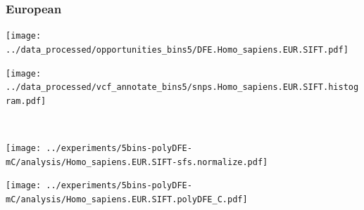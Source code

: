 \subsubsection{European}

\begin{minipage}{0.49\linewidth}
    \texttt{[image: ../data\_processed/opportunities\_bins5/DFE.Homo\_sapiens.EUR.SIFT.pdf]}
\end{minipage}
\begin{minipage}{0.49\linewidth}
    \texttt{[image: ../data\_processed/vcf\_annotate\_bins5/snps.Homo\_sapiens.EUR.SIFT.histogram.pdf]}
\end{minipage}
\\
\begin{minipage}{0.49\linewidth}
    \texttt{[image: ../experiments/5bins-polyDFE-mC/analysis/Homo\_sapiens.EUR.SIFT-sfs.normalize.pdf]}
\end{minipage}
\begin{minipage}{0.4\linewidth}
    \texttt{[image: ../experiments/5bins-polyDFE-mC/analysis/Homo\_sapiens.EUR.SIFT.polyDFE\_C.pdf]}
\end{minipage}
